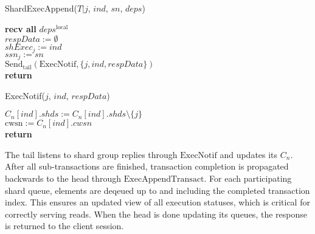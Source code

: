 \documentclass{article}
\begin{document}
\begin{procedure}[H]
  \caption{ShardExecAppend($T|j$, $ind$, $sn$, $deps$)}
   
  \textbf{recv all} $deps^{\text{local}}$\\
  $respData := \emptyset$\\
  $shExec_j := ind$ \\
  $ssn_j := sn$ \\
  $\text{Send}_{\text{tail}}(\text{ExecNotif}, \{j, ind, respData\})$\\
  \textbf{return}
\end{procedure}
\begin{procedure}[H]
  \caption{ExecNotif($j$, $ind$, $respData$)}
  $C_n[ind].shds := C_n[ind].shds\setminus\{ j\}$\\
  $\text{cwsn} := C_n[ind].cwsn$\\
       
  \textbf{return}
\end{procedure}
\par The tail listens to shard group replies through $\text{ExecNotif}$ and updates its $C_{n}$. After all sub-transactions are finished, transaction completion is propagated backwards to the head through $\text{ExecAppendTransact}$. For each participating shard queue, elements are deqeued up to and including the completed transaction index. This ensures an updated view of all execution statuses, which is critical for correctly serving reads. When the head is done updating its queues, the response is returned to the client session.\\
\end{document}
